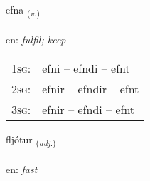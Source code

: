 \documentclass[frontgrid, backgrid]{flacards}\usepackage[]{graphicx}\usepackage[]{color}
\begin{document}
\renewcommand{\blhead}{\vskip5pt {\small\bfseries\footnotesize Sagnorð | Verb }}
\renewcommand{\bcfoot}{\vskip5pt \hspace{2pt}{\small\bfseries\footnotesize 2K}}


{efna \small{\textsubscript{(\textit{v.})}} \\[1ex] %
\textphonetic{[ɛpna]} \\
en: \emph{fulfil; keep} \\  [2ex]
\renewcommand*{\arraystretch}{0.8}
\begin{tabular}{p{1cm}l}
\textsc{1sg}: & efni -- efndi -- efnt \\ 
\textsc{2sg}: & efnir -- efndir -- efnt \\ 
\textsc{3sg}: & efnir -- efndi -- efnt \\ 
\end{tabular}
}

\renewcommand{\flhead}{\vskip5pt \fboxsep=0pt {\small\bfseries\footnotesize Lýsingarorð | Adjective}}
\renewcommand{\fcfoot}{\vskip5pt \fboxsep=0pt \hspace{2pt}{\small\bfseries\footnotesize 2K}}

\renewcommand{\blhead}{\vskip5pt {\small\bfseries\footnotesize Lýsingarorð | Adjective }}
\renewcommand{\bcfoot}{\vskip5pt \hspace{2pt}{\small\bfseries\footnotesize 2K}}


{fljótur \small{\textsubscript{(\textit{adj.})}} \\[1ex] %
\textphonetic{[fljouːtʏr]} \\
en: \emph{fast} \\  [2ex]
\renewcommand*{\arraystretch}{0.8}
}
\end{document}
